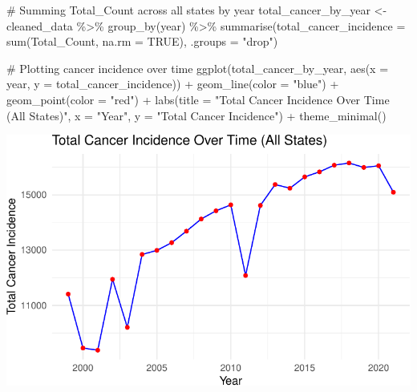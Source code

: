 \documentclass[
  12pt,
]{article}
\newenvironment{Shaded}{\begin{snugshade}}{\end{snugshade}}
\newcommand{\AttributeTok}[1]{\textcolor[rgb]{0.40,0.45,0.13}{#1}}
\newcommand{\CommentTok}[1]{\textcolor[rgb]{0.37,0.37,0.37}{#1}}
\newcommand{\ConstantTok}[1]{\textcolor[rgb]{0.56,0.35,0.01}{#1}}
\newcommand{\FunctionTok}[1]{\textcolor[rgb]{0.28,0.35,0.67}{#1}}
\newcommand{\NormalTok}[1]{\textcolor[rgb]{0.00,0.23,0.31}{#1}}
\newcommand{\OtherTok}[1]{\textcolor[rgb]{0.00,0.23,0.31}{#1}}
\newcommand{\SpecialCharTok}[1]{\textcolor[rgb]{0.37,0.37,0.37}{#1}}
\newcommand{\StringTok}[1]{\textcolor[rgb]{0.13,0.47,0.30}{#1}}
\begin{document}
\begin{Shaded}
\begin{Highlighting}[]
\CommentTok{\# Summing Total\_Count across all states by year}
\NormalTok{total\_cancer\_by\_year }\OtherTok{\textless{}{-}}\NormalTok{ cleaned\_data }\SpecialCharTok{\%\textgreater{}\%}
  \FunctionTok{group\_by}\NormalTok{(year) }\SpecialCharTok{\%\textgreater{}\%}
  \FunctionTok{summarise}\NormalTok{(}\AttributeTok{total\_cancer\_incidence =} \FunctionTok{sum}\NormalTok{(Total\_Count, }\AttributeTok{na.rm =} \ConstantTok{TRUE}\NormalTok{), }\AttributeTok{.groups =} \StringTok{"drop"}\NormalTok{)}

\CommentTok{\# Plotting cancer incidence over time}
\FunctionTok{ggplot}\NormalTok{(total\_cancer\_by\_year, }\FunctionTok{aes}\NormalTok{(}\AttributeTok{x =}\NormalTok{ year, }\AttributeTok{y =}\NormalTok{ total\_cancer\_incidence)) }\SpecialCharTok{+}
  \FunctionTok{geom\_line}\NormalTok{(}\AttributeTok{color =} \StringTok{"blue"}\NormalTok{) }\SpecialCharTok{+}
  \FunctionTok{geom\_point}\NormalTok{(}\AttributeTok{color =} \StringTok{"red"}\NormalTok{) }\SpecialCharTok{+}
  \FunctionTok{labs}\NormalTok{(}\AttributeTok{title =} \StringTok{"Total Cancer Incidence Over Time (All States)"}\NormalTok{, }
       \AttributeTok{x =} \StringTok{"Year"}\NormalTok{, }
       \AttributeTok{y =} \StringTok{"Total Cancer Incidence"}\NormalTok{) }\SpecialCharTok{+}
  \FunctionTok{theme\_minimal}\NormalTok{()}
\end{Highlighting}
\end{Shaded}

\includegraphics{final_main_quarto_presentation_files/figure-pdf/unnamed-chunk-13-1.pdf}
\end{document}

